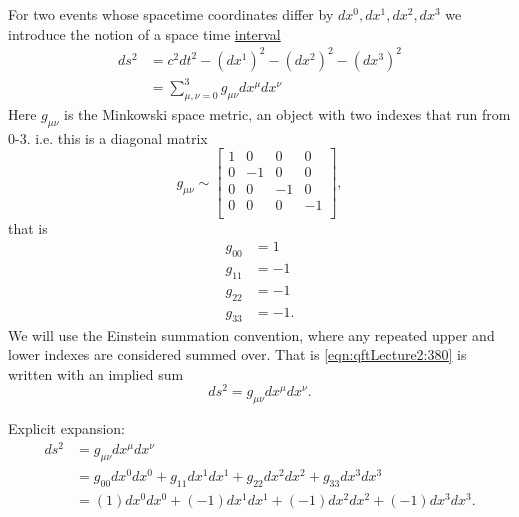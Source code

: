 For two events whose spacetime coordinates differ by \( dx^0, dx^1, dx^2, dx^3 \) we introduce the notion of a space time \underline{interval}
\begin{equation}\label{eqn:qftLecture2:380}
\begin{aligned}
ds^2
&= c^2 dt^2
- (dx^1)^2
- (dx^2)^2
- (dx^3)^2 \\
&=
\sum_{\mu, \nu = 0}^3 g_{\mu\nu} dx^\mu dx^\nu
\end{aligned}
\end{equation}
Here \( g_{\mu\nu} \) is the Minkowski space metric, an object with two indexes that run from 0-3.  i.e. this is a diagonal matrix
\begin{equation}\label{eqn:qftLecture2:400}
g_{\mu\nu} \sim
\begin{bmatrix}
1 & 0 & 0 & 0 \\
0 & -1 & 0 & 0 \\
0 & 0 & -1 & 0 \\
0 & 0 & 0 & -1 \\
\end{bmatrix},
\end{equation}
that is
\begin{equation}\label{eqn:qftLecture2:420}
\begin{aligned}
g_{00} &= 1 \\
g_{11} &= -1 \\
g_{22} &= -1 \\
g_{33} &= -1.
\end{aligned}
\end{equation}
We will use the Einstein summation convention, where any repeated upper and lower indexes are considered summed over.  That is \cref{eqn:qftLecture2:380} is written with an implied sum
\begin{equation}\label{eqn:qftLecture2:440}
ds^2 = g_{\mu\nu} dx^\mu dx^\nu.
\end{equation}

Explicit expansion:
\begin{equation}\label{eqn:qftLecture2:460}
\begin{aligned}
ds^2 
&= g_{\mu\nu} dx^\mu dx^\nu \\
&=
g_{00} dx^0 dx^0
+g_{11} dx^1 dx^1
+g_{22} dx^2 dx^2
+g_{33} dx^3 dx^3 \\
&=
(1) dx^0 dx^0
+ (-1) dx^1 dx^1
+ (-1) dx^2 dx^2
+ (-1) dx^3 dx^3.
\end{aligned}
\end{equation}

